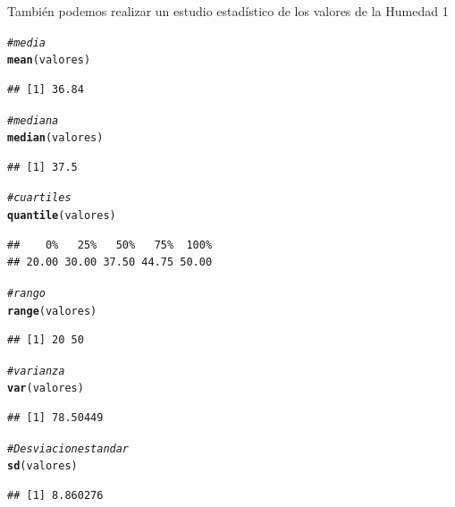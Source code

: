 \documentclass[10pt]{article}\usepackage[]{graphicx}\usepackage[]{color}
\makeatletter
\newcommand{\hlcom}[1]{\textcolor[rgb]{0.678,0.584,0.686}{\textit{#1}}}%
\newcommand{\hlstd}[1]{\textcolor[rgb]{0.345,0.345,0.345}{#1}}%
\newcommand{\hlkwd}[1]{\textcolor[rgb]{0.737,0.353,0.396}{\textbf{#1}}}%
\newenvironment{kframe}{%
 \def\at@end@of@kframe{}%
 \ifinner\ifhmode%
  \def\at@end@of@kframe{\end{minipage}}%
  \begin{minipage}{\columnwidth}%
 \fi\fi%
 \def\FrameCommand##1{\hskip\@totalleftmargin \hskip-\fboxsep
 \colorbox{shadecolor}{##1}\hskip-\fboxsep
     \hskip-\linewidth \hskip-\@totalleftmargin \hskip\columnwidth}%
 \MakeFramed {\advance\hsize-\width
   \@totalleftmargin\z@ \linewidth\hsize
   \@setminipage}}%
 {\par\unskip\endMakeFramed%
 \at@end@of@kframe}
\newenvironment{knitrout}{}{} %
\makeatother
\begin{document}
 
También podemos realizar un estudio estadístico de los valores de la Humedad 1  
\begin{knitrout}
\color{fgcolor}\begin{kframe}
\begin{alltt}
\hlcom{#media}
\hlkwd{mean}\hlstd{(valores)}
\end{alltt}
\begin{verbatim}
## [1] 36.84
\end{verbatim}
\begin{alltt}
\hlcom{#mediana}
\hlkwd{median}\hlstd{(valores)}
\end{alltt}
\begin{verbatim}
## [1] 37.5
\end{verbatim}
\begin{alltt}
\hlcom{#cuartiles}
\hlkwd{quantile}\hlstd{(valores)}
\end{alltt}
\begin{verbatim}
##    0%   25%   50%   75%  100% 
## 20.00 30.00 37.50 44.75 50.00
\end{verbatim}
\begin{alltt}
\hlcom{#rango}
\hlkwd{range}\hlstd{(valores)}
\end{alltt}
\begin{verbatim}
## [1] 20 50
\end{verbatim}
\begin{alltt}
\hlcom{#varianza}
\hlkwd{var}\hlstd{(valores)}
\end{alltt}
\begin{verbatim}
## [1] 78.50449
\end{verbatim}
\begin{alltt}
\hlcom{#Desviacion estandar}
\hlkwd{sd}\hlstd{(valores)}
\end{alltt}
\begin{verbatim}
## [1] 8.860276
\end{verbatim}
\end{kframe}
\end{knitrout}
\end{document}
